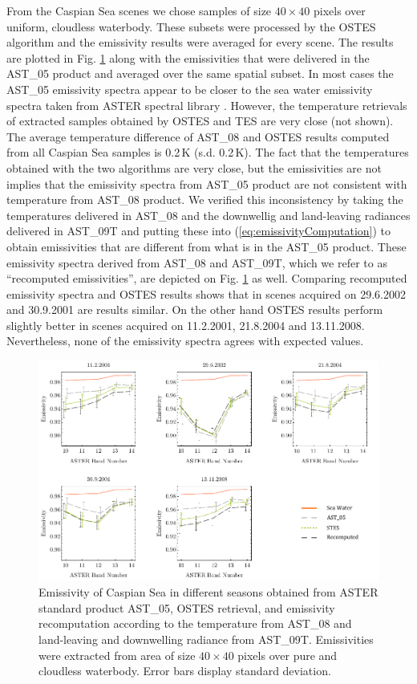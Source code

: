 From the Caspian Sea scenes we chose samples of size $40 \times 40$ pixels over uniform, cloudless waterbody. These subsets were processed by the OSTES algorithm and the emissivity results were averaged for every scene. The results are plotted in Fig. \ref{fig:CaspianSeaEmissivity} along with the emissivities that were delivered in the AST\_05 product and averaged over the same spatial subset. In most cases the AST\_05 emissivity spectra appear to be closer to the sea water emissivity spectra taken from ASTER spectral library \cite{BH09}. However, the temperature retrievals of extracted samples obtained by OSTES and TES are very close (not shown). The average temperature difference of AST\_08 and OSTES results computed from all Caspian Sea samples is 0.2\,K (s.d. 0.2\,K). The fact that the temperatures obtained with the two algorithms are very close, but the emissivities are not implies that the emissivity spectra from AST\_05 product are not consistent with temperature from AST\_08 product. We verified this inconsistency by taking the temperatures delivered in AST\_08 and the downwellig and land-leaving radiances delivered in AST\_09T and putting these into (\ref{eq:emissivityComputation}) to obtain emissivities that are different from what is in the AST\_05 product. These emissivity spectra derived from AST\_08 and AST\_09T, which we refer to as ``recomputed emissivities'', are depicted on Fig. \ref{fig:CaspianSeaEmissivity} as well. Comparing recomputed emissivity spectra and OSTES results shows that in scenes acquired on 29.6.2002 and 30.9.2001 are results similar. On the other hand OSTES results perform slightly better in scenes acquired on 11.2.2001, 21.8.2004 and 13.11.2008. Nevertheless, none of the emissivity spectra agrees with expected values.

\begin{figure}[!t]
\centering
\includegraphics[width=0.98\linewidth]{pics/Chapter_04/Caspian.pdf}
\vspace{1.5 em}
\caption{Emissivity of Caspian Sea in different seasons obtained from ASTER standard product AST\_05, OSTES retrieval, and emissivity recomputation according to the temperature from AST\_08 and land-leaving and downwelling radiance from AST\_09T. Emissivities were extracted from area of size $40 \times 40$ pixels over pure and cloudless waterbody. Error bars display standard deviation.}
\label{fig:CaspianSeaEmissivity}
\end{figure}

